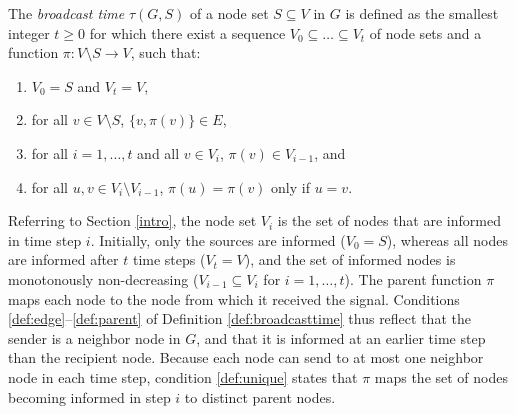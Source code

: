\begin{definition} \label{def:broadcasttime}
The \emph{broadcast time} $\tau(G,S)$ of a node set $S\subseteq V$ in $G$ is defined as the smallest integer $t\geq 0$ for which there exist
a sequence $V_0\subseteq\dots\subseteq V_t$ of node sets and a function $\pi:V\setminus S\to V$, such that:
\begin{enumerate}
  \item $V_0=S$ and $V_t=V$, \label{def:boundary}
  \item for all $v\in V\setminus S$, $\{v,\pi(v)\}\in E$, \label{def:edge}
  \item for all $i=1,\ldots,t$ and all $v\in V_i$, $\pi(v)\in V_{i-1}$, and \label{def:parent}
  \item for all $u,v\in V_i\setminus V_{i-1}$, $\pi(u)=\pi(v)$ only if $u=v$. \label{def:unique}
\end{enumerate}
\end{definition}

Referring to Section \ref{intro}, the node set $V_i$ is the set of nodes that are informed in time step $i$.
Initially, only the sources are informed ($V_0=S$), whereas all nodes are informed after $t$ time steps ($V_t=V$),
and the set of informed nodes is monotonously non-decreasing ($V_{i-1}\subseteq V_i$ for $i=1,\ldots,t$).
The parent function $\pi$ maps each node to the node from which it received the signal.
Conditions \ref{def:edge}--\ref{def:parent} of Definition \ref{def:broadcasttime} thus reflect that the sender is a neighbor node in $G$,
and that it is informed at an earlier time step than the recipient node.
Because each node can send to at most one neighbor node in each time step,
condition \ref{def:unique} states that $\pi$ maps the set of nodes becoming informed in step $i$ to distinct parent nodes.

